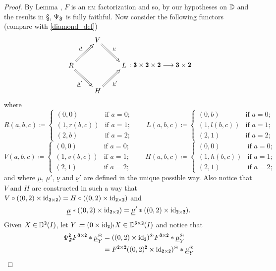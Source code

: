 \begin{proof}
By Lemma , $F$ is an \textsc{em} factorization and so, by our hypotheses on $\mathbb{D}$ and the results in §, $\Psi_{\mathfrak{F}}$ is fully faithful. Now consider the following functors (compare with \eqref{diamond_def})
\[
\begin{matrix}\xymatrix{
&V\ar@{=>}[dr]^{\underline\nu}\\
R\ar@{=>}[dr]_{\underline\mu'}\ar@{=>}[ur]^{\underline\mu}&&L\\
&H\ar@{=>}[ur]_{\underline\nu'}
}\end{matrix}
\colon \tre\times \due\times \due\longrightarrow  \tre\times\due
\]
where
\[
R(a,b,c) \coloneqq \begin{cases}
(0,0)&\text{if $a=0$;}\\
(1,r(b,c))&\text{if $a=1$;}\\
(2,b)&\text{if $a=2$;}
\end{cases}
\qquad
 L(a,b,c) \coloneqq \begin{cases}
(0,b)&\text{if $a=0$;}\\
(1,l(b,c))&\text{if $a=1$;}\\
(2,1)&\text{if $a=2$;}
\end{cases}
\]
\[
V(a,b,c) \coloneqq \begin{cases}
(0,0)&\text{if $a=0$;}\\
(1,v(b,c))&\text{if $a=1$;}\\
(2,1)&\text{if $a=2$;}
\end{cases}
\qquad
 H(a,b,c) \coloneqq \begin{cases}
(0,0)&\text{if $a=0$;}\\
(1,h(b,c))&\text{if $a=1$;}\\
(2,1)&\text{if $a=2$;}
\end{cases}
\]
and where $\underline\mu$, $\underline\mu'$, $\underline\nu$ and $\underline\nu'$ are defined in the unique possible way. Also notice that $V$ and $H$ are constructed in such a way that $V\circ ((0,2)\times \id_{\due\times \due})=H\circ ((0,2)\times \id_{\due\times \due})$ and
\[
\underline\mu*((0,2)\times \id_{\due\times \due})=\underline\mu'*((0,2)\times \id_{\due\times \due}).
\]
Given $X\in \D^\due(I)$, let $Y \coloneqq (0\times\id_\due)_!X\in \D^{\tre\times \due}(I)$ and notice that
\begin{align*}
\Psi^\due_\F F^{\tre\times\due}*\underline \mu^\circledast_Y&=((0,2)\times\id_\due)^\circledast F^{\tre\times\due}*\underline \mu^\circledast_Y\\
&=F^{\due\times\due}((0,2)^\due\times\id_{\due\times\due})^\circledast*\underline \mu^\circledast_Y\\

\end{align*}
\end{proof}
